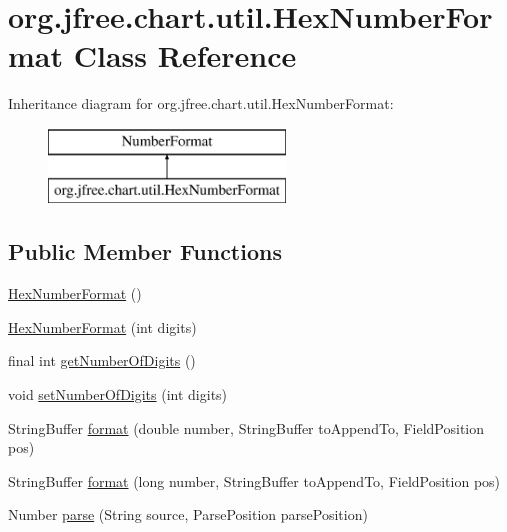 \hypertarget{classorg_1_1jfree_1_1chart_1_1util_1_1_hex_number_format}{}\section{org.\+jfree.\+chart.\+util.\+Hex\+Number\+Format Class Reference}
\label{classorg_1_1jfree_1_1chart_1_1util_1_1_hex_number_format}
Inheritance diagram for org.\+jfree.\+chart.\+util.\+Hex\+Number\+Format\+:\begin{figure}[H]
\begin{center}
\leavevmode
\includegraphics[height=2.000000cm]{classorg_1_1jfree_1_1chart_1_1util_1_1_hex_number_format}
\end{center}
\end{figure}
\subsection*{Public Member Functions}
\begin{DoxyCompactItemize}
\item 
\mbox{\hyperlink{classorg_1_1jfree_1_1chart_1_1util_1_1_hex_number_format_af4d5f14b2f65e1904803eef43a7e0ba0}{Hex\+Number\+Format}} ()
\item 
\mbox{\hyperlink{classorg_1_1jfree_1_1chart_1_1util_1_1_hex_number_format_a8548044999f9a1a0f102f3ed5defd9c8}{Hex\+Number\+Format}} (int digits)
\item 
final int \mbox{\hyperlink{classorg_1_1jfree_1_1chart_1_1util_1_1_hex_number_format_a812af5b3ad68bf3409c5fb1d81415d66}{get\+Number\+Of\+Digits}} ()
\item 
void \mbox{\hyperlink{classorg_1_1jfree_1_1chart_1_1util_1_1_hex_number_format_a134b4b389c64ecf6fbe95a5131ccc5eb}{set\+Number\+Of\+Digits}} (int digits)
\item 
String\+Buffer \mbox{\hyperlink{classorg_1_1jfree_1_1chart_1_1util_1_1_hex_number_format_ab535fc7fd936d62c53469f85c728c214}{format}} (double number, String\+Buffer to\+Append\+To, Field\+Position pos)
\item 
String\+Buffer \mbox{\hyperlink{classorg_1_1jfree_1_1chart_1_1util_1_1_hex_number_format_a89694d4c793548d1558070be8f7244d6}{format}} (long number, String\+Buffer to\+Append\+To, Field\+Position pos)
\item 
Number \mbox{\hyperlink{classorg_1_1jfree_1_1chart_1_1util_1_1_hex_number_format_ab6c821389cd089b7b5beb129be0e2fbc}{parse}} (String source, Parse\+Position parse\+Position)
\end{DoxyCompactItemize}
